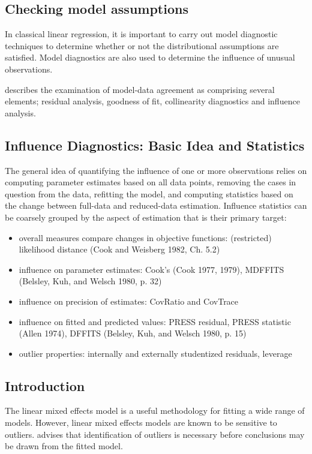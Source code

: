 \documentclass[12pt, a4paper]{report}
\theoremstyle{plain}
\theoremstyle{definition}
\theoremstyle{remark}
\begin{document}
\subsection{Checking model assumptions}
In classical linear regression, it is important to carry out model diagnostic techniques to determine whether or not the distributional assumptions are satisfied. Model diagnostics are also used to determine the influence of unusual observations.

\citet{schabenberger} describes the examination of model-data agreement as comprising several elements; residual analysis, goodness of fit, collinearity diagnostics and influence analysis.

\subsection{Influence Diagnostics: Basic Idea and Statistics}

The general idea of quantifying the influence of one or more observations relies on computing parameter estimates based on all data points, removing the cases in question from the data, refitting the model, and computing statistics based on the change between full-data and reduced-data estimation. Influence statistics can be coarsely grouped by the aspect of estimation that is their primary target:
\begin{itemize}
\item overall measures compare changes in objective functions: (restricted) likelihood distance (Cook and Weisberg 1982, Ch. 5.2)
\item influence on parameter estimates: Cook's  (Cook 1977, 1979), MDFFITS (Belsley, Kuh, and Welsch 1980, p. 32)
\item influence on precision of estimates: CovRatio and CovTrace
\item influence on fitted and predicted values: PRESS residual, PRESS statistic (Allen 1974), DFFITS (Belsley, Kuh, and Welsch 1980, p. 15)
\item outlier properties: internally and externally studentized residuals, leverage
\end{itemize}

\subsection{Introduction }
The linear mixed effects model is a useful methodology for fitting a wide range of models. However, linear mixed effects models are known to be sensitive to outliers. \citet{christensen} advises that identification of outliers is necessary before conclusions may be drawn from the fitted model.
\end{document}
